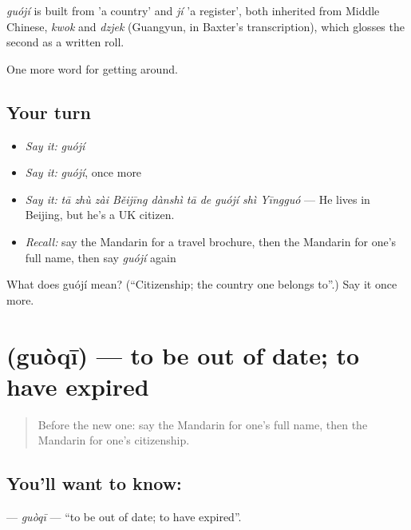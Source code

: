 \begin{cousinweb}
\emph{guójí} is built from  'a country' and \emph{jí} 'a register', both inherited from Middle Chinese, \emph{kwok} and \emph{dzjek} (Guangyun, in Baxter's transcription), which glosses the second as a written roll.
\end{cousinweb}

\begin{grammarlens}[title={What you've built}]
One more word for getting around.
\end{grammarlens}

\subsection*{Your turn}
\begin{itemize}
\raggedright
  \item \emph{Say it:} \emph{guójí}
  \item \emph{Say it:} \emph{guójí}, once more
  \item \emph{Say it:} \emph{tā zhù zài Běijīng dànshì tā de guójí shì Yīngguó} — He lives in Beijing, but he's a UK citizen.
  \item \emph{Recall:} say the Mandarin for a travel brochure, then the Mandarin for one's full name, then say \emph{guójí} again
\end{itemize}

\begin{tcolorbox}[breakable,colback=teal!4,colframe=teal!35!black,title={Before you move on}]
What does guójí mean? (\textquotedblleft{}Citizenship; the country one belongs to\textquotedblright{}.) Say it once more.
\end{tcolorbox}
\section[\texorpdfstring{\zh{过期} (guòqī)}{过期 (guòqī)}]{ (guòqī) — to be out of date; to have expired}

\label{lesson:ZH-C455-guoqi}



\begin{quote}
Before the new one: say the Mandarin for one's full name, then the Mandarin for one's citizenship.
\end{quote}

\subsection*{You'll want to know: }
\textbf{} — \emph{guòqī} — \textquotedblleft{}to be out of date; to have expired\textquotedblright{}.

